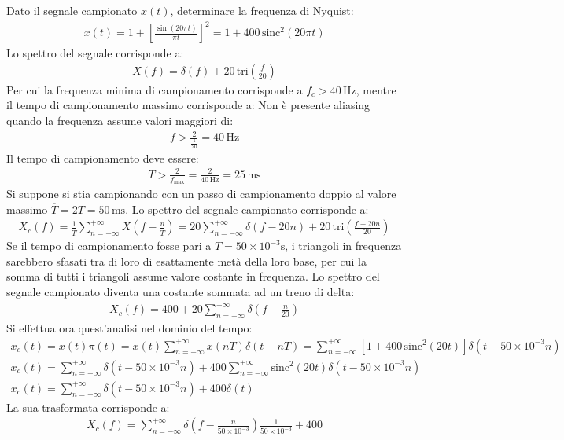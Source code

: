 \documentclass{article}
\newcommand{\sinc}{\mathrm{sinc}}
\newcommand{\tri}{\mathrm{tri}}
\begin{document}
Dato il segnale campionato $x(t)$, determinare la frequenza di Nyquist: 
\begin{gather*}
    x(t)=1+\left[\displaystyle\frac{\sin(20\pi t)}{\pi t}\right]^2=1+400\,\sinc^2\left(20\pi t\right)
\end{gather*}
Lo spettro del segnale corrisponde a:
\begin{gather*}
    X(f)=\displaystyle \delta(f)+20\,\tri \left(\frac{f}{20}\right)
\end{gather*}
Per cui la frequenza minima di campionamento corrisponde a $f_c>40\,\mathrm{Hz}$, mentre il tempo di campionamento massimo corrisponde a:
Non è presente aliasing quando la frequenza assume valori maggiori di:
\begin{gather*}
    f>\displaystyle\frac{2}{\frac{1}{20}}=40\,\mathrm{Hz}
\end{gather*}
Il tempo di campionamento deve essere:
\begin{gather}
    T>\displaystyle\frac{2}{f_{\max}}=\frac{2}{40\,\mathrm{Hz}}=25\,\mathrm{ms}
\end{gather}
Si suppone si stia campionando con un passo di campionamento doppio al valore massimo $\overline{T}=2T=50\,\mathrm{ms}$. Lo spettro del segnale campionato corrisponde a:
\begin{gather*}
    X_c(f)=\displaystyle \frac{1}{\overline{T}}\sum_{n=-\infty}^{+\infty}X\left(f-\frac{n}{\overline{T}}\right)=20\sum_{n=-\infty}^{+\infty}\delta(f-20n)+20\,\tri \left(\frac{f-20n}{20}\right)
\end{gather*}
Se il tempo di campionamento fosse pari a $T=50\times10^{-3}\mathrm{s}$, i triangoli in frequenza sarebbero sfasati tra di loro di esattamente metà della loro base, per cui la 
somma di tutti i triangoli assume valore costante in frequenza. 
Lo spettro del segnale campionato diventa una costante sommata ad un treno di delta:
\begin{gather}
    X_c(f)=400+20\displaystyle\sum_{n=-\infty}^{+\infty}\delta\left(f-\frac{n}{20}\right)
\end{gather}
Si effettua ora quest'analisi nel dominio del tempo:
\begin{gather*}
    x_c(t)=x(t)\pi(t)=x(t)\displaystyle\sum_{n=-\infty}^{+\infty}x(nT)\delta(t-nT)=\sum_{n=-\infty}^{+\infty}\left[1+400\,\sinc^2\left(20t\right)\right]\delta(t-50\times10^{-3}n)\\
    x_c(t)=\displaystyle\sum_{n=-\infty}^{+\infty}\delta(t-50\times10^{-3}n)+400\sum_{n=-\infty}^{+\infty}\sinc^2(20t)\delta(t-50\times10^{-3}n)\\
    x_c(t)=\displaystyle\sum_{n=-\infty}^{+\infty}\delta(t-50\times10^{-3}n)+400\delta(t)
\end{gather*}
La sua trasformata corrisponde a:
\begin{gather}
    X_c(f)=\displaystyle\sum_{n=-\infty}^{+\infty}\delta\left(f-\frac{n}{50\times10^{-3}}\right)\frac{1}{50\times10^{-3}}+400
\end{gather}
\end{document}
